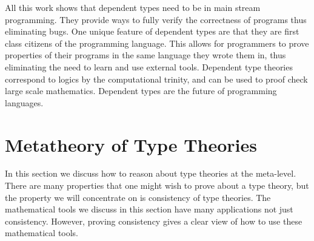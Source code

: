 All this work shows that dependent types need to be in main stream
programming.  They provide ways to fully verify the correctness of
programs thus eliminating bugs.  One unique feature of dependent types
are that they are first class citizens of the programming language.
This allows for programmers to prove properties of their programs in
the same language they wrote them in,  thus eliminating the need to
learn and use external tools.  Dependent type theories correspond to
logics by the computational trinity, and can be used to
proof check large scale mathematics.  Dependent types are the future
of programming languages.
\chapter{Metatheory of Type Theories}
\label{chap:metatheory_of_programming_languages}
In this section we discuss how to reason about type theories at the
meta-level.  There are many properties that one might wish to prove
about a type theory, but the property we will concentrate on is
consistency of type theories.  The mathematical tools we discuss in
this section have many applications not just consistency.  However,
proving consistency gives a clear view of how to use these
mathematical tools.

